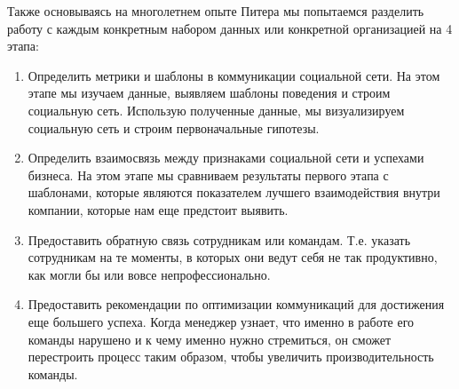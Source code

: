 Также основываясь на многолетнем опыте Питера мы попытаемся разделить работу с каждым конкретным набором данных или конкретной организацией на 4 этапа:

\begin{enumerate}
	\item Определить метрики и шаблоны в коммуникации социальной сети. На этом этапе мы изучаем данные, выявляем шаблоны поведения и строим социальную сеть. Использую полученные данные, мы визуализируем социальную сеть и строим первоначальные гипотезы.
	\item Определить взаимосвязь между признаками социальной сети и успехами бизнеса. На этом этапе мы сравниваем результаты первого этапа с шаблонами, которые являются показателем лучшего взаимодействия внутри компании, которые нам еще предстоит выявить.
	\item Предоставить обратную связь сотрудникам или командам. Т.е. указать сотрудникам на те моменты, в которых они ведут себя не так продуктивно, как могли бы или вовсе непрофессионально. 
	\item Предоставить рекомендации по оптимизации коммуникаций для достижения еще большего успеха. Когда менеджер узнает, что именно в работе его команды нарушено и к чему именно нужно стремиться, он сможет перестроить процесс таким образом, чтобы увеличить производительность команды.
\end{enumerate}

 